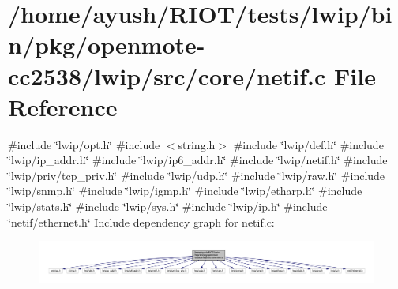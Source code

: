 \hypertarget{openmote-cc2538_2lwip_2src_2core_2netif_8c}{}\section{/home/ayush/\+R\+I\+O\+T/tests/lwip/bin/pkg/openmote-\/cc2538/lwip/src/core/netif.c File Reference}
\label{openmote-cc2538_2lwip_2src_2core_2netif_8c}
{\ttfamily \#include \char`\"{}lwip/opt.\+h\char`\"{}}\newline
{\ttfamily \#include $<$string.\+h$>$}\newline
{\ttfamily \#include \char`\"{}lwip/def.\+h\char`\"{}}\newline
{\ttfamily \#include \char`\"{}lwip/ip\+\_\+addr.\+h\char`\"{}}\newline
{\ttfamily \#include \char`\"{}lwip/ip6\+\_\+addr.\+h\char`\"{}}\newline
{\ttfamily \#include \char`\"{}lwip/netif.\+h\char`\"{}}\newline
{\ttfamily \#include \char`\"{}lwip/priv/tcp\+\_\+priv.\+h\char`\"{}}\newline
{\ttfamily \#include \char`\"{}lwip/udp.\+h\char`\"{}}\newline
{\ttfamily \#include \char`\"{}lwip/raw.\+h\char`\"{}}\newline
{\ttfamily \#include \char`\"{}lwip/snmp.\+h\char`\"{}}\newline
{\ttfamily \#include \char`\"{}lwip/igmp.\+h\char`\"{}}\newline
{\ttfamily \#include \char`\"{}lwip/etharp.\+h\char`\"{}}\newline
{\ttfamily \#include \char`\"{}lwip/stats.\+h\char`\"{}}\newline
{\ttfamily \#include \char`\"{}lwip/sys.\+h\char`\"{}}\newline
{\ttfamily \#include \char`\"{}lwip/ip.\+h\char`\"{}}\newline
{\ttfamily \#include \char`\"{}netif/ethernet.\+h\char`\"{}}\newline
Include dependency graph for netif.\+c\+:
\nopagebreak
\begin{figure}[H]
\begin{center}
\leavevmode
\includegraphics[width=350pt]{openmote-cc2538_2lwip_2src_2core_2netif_8c__incl}
\end{center}
\end{figure}
